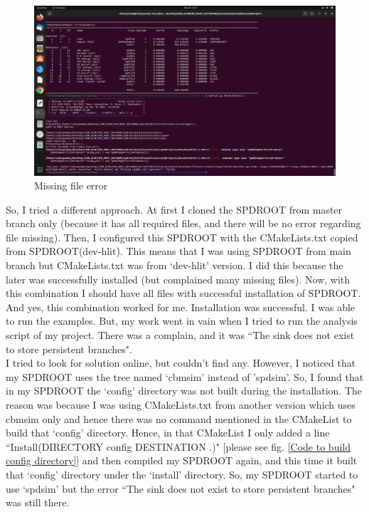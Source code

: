 \documentclass[12pt]{article}
\begin{document}
\begin{figure}[h]
\centering
\includegraphics[scale=0.18]{ss1.png}
\caption{Missing file error}
\label{Missing file error}
\end{figure}

So, I tried a different approach. At first I cloned the SPDROOT from master branch only (because it has all required files, and there will be no error regarding file missing). Then, I configured this SPDROOT with the CMakeLists.txt copied from SPDROOT(dev-hlit).
This means that I was using SPDROOT from main branch but CMakeLists.txt was from `dev-hlit' version. I did this because the later was successfully installed (but complained many missing files). Now, with this combination I should have all files with successful installation of SPDROOT. And yes, this combination worked for me. Installation was successful. I was able to run the examples. But, my work went in vain when I tried to run the analysis script of my project. There was a complain, and it was ``The sink does not exist to store persistent branches".\\

I tried to look for solution online, but couldn't find any. However, I noticed that my SPDROOT uses the tree named `cbmsim' instead of 'spdsim'. So, I found that in my SPDROOT the `config' directory was not built during the installation. The reason was because I was using CMakeLists.txt from another version which uses cbmsim only and hence there was no command mentioned in the CMakeList to build that `config' directory. Hence, in that CMakeList I only added a line ``Install(DIRECTORY config DESTINATION .)" [please see fig. \ref{Code to build config directory}] and then compiled my SPDROOT again, and this time it built that `config' directory under the `install' directory. So, my SPDROOT started to use `spdsim' but the error ``The sink does not exist to store persistent branches" was still there.\\
\end{document}
